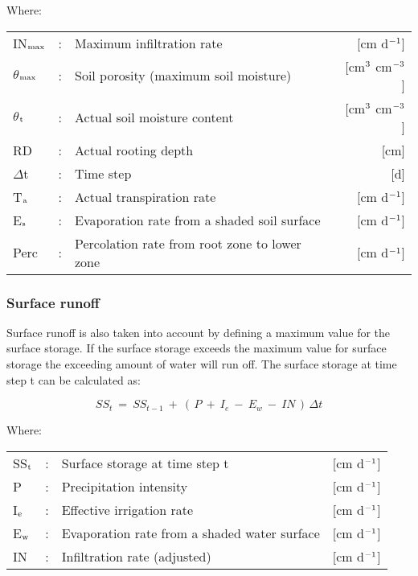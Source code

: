 Where:\\[5pt]
\begin{tabularx}{\textwidth}{llXr}
	IN$_{{\rm max}}$ &:& Maximum infiltration rate  & [cm d$^{{\rm -1}}$]\\
	$\theta$$_{{\rm max}}$ &:& Soil porosity (maximum soil moisture)  
	& [cm$^{{\rm 3}}$ cm$^{{\rm -3}}$]\\
	$\theta$$_{{\rm t}}$ &:& Actual soil moisture content  
	& [cm$^{{\rm 3}}$ cm$^{{\rm -3}}$]\\
	RD &:& Actual rooting depth  & [cm]\\
	$\Delta$t &:& Time step  & [d]\\
	T$_{{\rm a}}$ &:& Actual transpiration rate   & [cm d$^{{\rm -1}}$]\\
	E$_{{\rm s}}$ &:& Evaporation rate from a shaded soil surface  & [cm d$^{{\rm -1}}$]\\
	Perc &:& Percolation rate from root zone to lower zone  & [cm d$^{{\rm -1}}$]\\
\end{tabularx}

\subsubsection{Surface runoff}

Surface runoff is also taken into account by defining a maximum value for the surface
storage. If the surface storage exceeds the maximum value for surface storage the
exceeding amount of water will run off. The surface storage at time step t can be
calculated as:

\begin{equation}
\label{eq:6.29}
SS_{t} ~=~ SS _{t-1} ~+~ (\, P ~+~ I _{e} ~-~ E _{w} ~-~ IN\, )\, \Delta t
\end{equation}

Where:\\[5pt]
\begin{tabularx}{\textwidth}{llXr}
	SS$_{{\rm t}}$ &:& Surface storage at time step t  & [cm d$^{{\rm -1}}$]\\
	P &:& Precipitation intensity  & [cm d$^{{\rm -1}}$]\\
	I$_{{\rm e}}$ &:& Effective irrigation rate  & [cm d$^{{\rm -1}}$]\\
	E$_{{\rm w}}$ &:& Evaporation rate from a shaded water surface  & [cm d$^{{\rm -1}}$]\\
	IN &:& Infiltration rate (adjusted)  & [cm d$^{{\rm -1}}$]\\
\end{tabularx}

